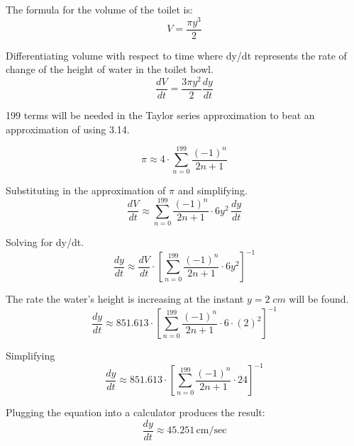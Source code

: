 \documentclass[12pt, titlepage]{article}
\begin{document}
The formula for the volume of the toilet is:
\begin{equation*}
    V = \frac{\pi y^3}{2}
\end{equation*}

Differentiating volume with respect to time where dy/dt represents the rate of change of the height of water in the toilet bowl.
\begin{equation*}
  \frac{dV}{dt} = \frac{3 \pi y^2}{2} \frac{dy}{dt}
\end{equation*}

199 terms will be needed in the Taylor series approximation to beat an approximation of using 3.14.

\begin{equation*}
  \pi \approx 4 \cdot \sum_{n=0}^{199}{\frac{(-1)^n}{2n+1}}
\end{equation*}

Substituting in the approximation of \(\pi\) and simplifying.
\begin{equation*}
  \frac{dV}{dt} \approx \sum_{n=0}^{199}{\frac{(-1)^n}{2n+1}}  \cdot 6y^{2} \,\frac{dy}{dt}
\end{equation*}


Solving for dy/dt.
\begin{equation*}
  \frac{dy}{dt} \approx \frac{dV}{dt} \cdot [\sum_{n=0}^{199}{ \frac{(-1)^n}{2n+1} }  \cdot 6y^{2}]^{-1}
\end{equation*}

The rate the water's height is increasing at the instant \(y = 2 \; cm\) will be found.
\begin{equation*}
  \frac{dy}{dt} \approx 851.613 \cdot  [\sum_{n=0}^{199}{ \frac{(-1)^n}{2n+1} }  \cdot 6 \cdot (2)^{2}]^{-1}
\end{equation*}

Simplifying
\begin{equation*}
  \frac{dy}{dt} \approx 851.613 \cdot  [\sum_{n=0}^{199}{ \frac{(-1)^n}{2n+1} }  \cdot 24]^{-1}
\end{equation*}

Plugging the equation into a calculator produces the result:
\begin{equation*}
  \frac{dy}{dt} \approx 45.251 \,\textrm{cm/sec}
\end{equation*}
\end{document}
